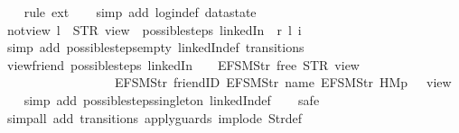 \begin{isabellebody}
%
\isadelimproof
\ \ %
\endisadelimproof
%
\isatagproof
{}\isamarkupfalse%
\ {\isacharparenleft}rule\ ext{\isacharparenright}\isanewline
\ \ \isamarkupfalse%
\ {\isacharparenleft}simp\ add{\isacharcolon}\ login{\isacharunderscore}def\ datastate{\isacharparenright}%
\endisatagproof
{\isafoldproof}%
%
\isadelimproof
\isanewline
%
\endisadelimproof
\isanewline
{}\isamarkupfalse%
\ not{\isacharunderscore}view{\isacharunderscore}{}{\isacharcolon}\ {\isachardoublequoteopen}l\ {\isasymnoteq}\ STR\ {\isacharprime}{\isacharprime}view{\isacharprime}{\isacharprime}\ {\isasymLongrightarrow}\ possible{\isacharunderscore}steps\ linkedIn\ {}\ r\ l\ i\ {\isacharequal}\ {\isacharbraceleft}{\isacharbar}{\isacharbar}{\isacharbraceright}{\isachardoublequoteclose}\isanewline
%
\isadelimproof
\ \ %
\endisadelimproof
%
\isatagproof
{}\isamarkupfalse%
\ {\isacharparenleft}simp\ add{\isacharcolon}\ possible{\isacharunderscore}steps{\isacharunderscore}empty\ linkedIn{\isacharunderscore}def\ transitions{\isacharparenright}%
\endisatagproof
{\isafoldproof}%
%
\isadelimproof
\isanewline
%
\endisadelimproof
\isanewline
{}\isamarkupfalse%
\ view{\isacharunderscore}friend{\isacharcolon}\ {\isachardoublequoteopen}possible{\isacharunderscore}steps\ linkedIn\ {}\ {\isacharless}{}\ {\isacharcolon}{\isacharequal}\ EFSM{\isachardot}Str\ {\isacharprime}{\isacharprime}free{\isacharprime}{\isacharprime}{\isachargreater}\ STR\ {\isacharprime}{\isacharprime}view{\isacharprime}{\isacharprime}\isanewline
\ \ \ \ \ \ \ \ \ \ \ \ \ \ \ \ \ \ {\isacharbrackleft}EFSM{\isachardot}Str\ {\isacharprime}{\isacharprime}friendID{\isacharprime}{\isacharprime}{\isacharcomma}\ EFSM{\isachardot}Str\ {\isacharprime}{\isacharprime}name{\isacharprime}{\isacharprime}{\isacharcomma}\ EFSM{\isachardot}Str\ {\isacharprime}{\isacharprime}HM{}p{\isacharprime}{\isacharprime}{\isacharbrackright}\ {\isacharequal}\ {\isacharbraceleft}{\isacharbar}{\isacharparenleft}{}{\isacharcomma}\ view{\isacharparenright}{\isacharbar}{\isacharbraceright}{\isachardoublequoteclose}\isanewline
%
\isadelimproof
\ \ %
\endisadelimproof
%
\isatagproof
{}\isamarkupfalse%
\ {\isacharparenleft}simp\ add{\isacharcolon}\ possible{\isacharunderscore}steps{\isacharunderscore}singleton\ linkedIn{\isacharunderscore}def{\isacharparenright}\isanewline
\ \ \isamarkupfalse%
\ safe\isanewline
\ \ \isamarkupfalse%
\ {\isacharparenleft}simp{\isacharunderscore}all\ add{\isacharcolon}\ transitions\ apply{\isacharunderscore}guards\ implode\ Str{\isacharunderscore}def{\isacharparenright}%

\end{isabellebody}
